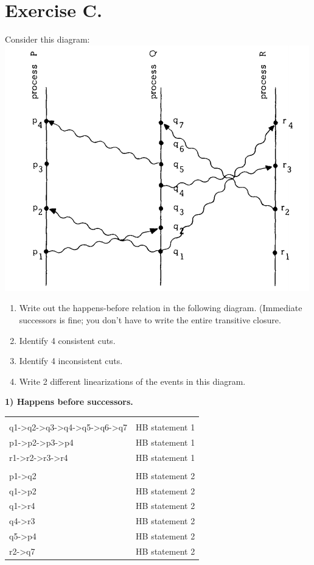 \section{Exercise C.}
Consider this diagram:\\

\includegraphics[scale=0.7]{ExerciseC-processDiagram}\\
\begin{enumerate}
\item Write out the happens-before relation in the following diagram. (Immediate successors is fine; you don’t have to write the entire transitive closure.
\item Identify 4 consistent cuts.
\item Identify 4 inconsistent cuts.
\item Write 2 different linearizations of the events in this diagram.
\end{enumerate}

\textbf{1) Happens before successors.}\\
\begin{tabular}{ l r }
\hline \\[0.1cm]
q1->q2->q3->q4->q5->q6->q7 	& HB statement 1 \\[0.1cm]
p1->p2->p3->p4 				& HB statement 1 \\[0.1cm]
r1->r2->r3->r4 				& HB statement 1 \\[0.1cm]
\hline \\[0.1cm]
p1->q2 & HB statement 2 \\[0.1cm]
q1->p2 & HB statement 2 \\[0.1cm]
q1->r4 & HB statement 2 \\[0.1cm]
q4->r3 & HB statement 2 \\[0.1cm]
q5->p4 & HB statement 2 \\[0.1cm]
r2->q7 & HB statement 2 \\[0.1cm]
\hline 
\end{tabular}\\\\

